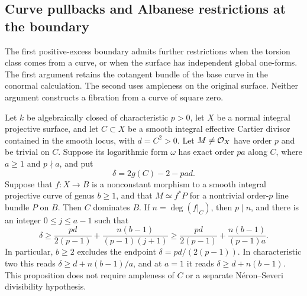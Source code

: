 \subsection{Curve pullbacks and Albanese restrictions at the boundary}
\label{subsec:boundary-albanese-restrictions}

The first positive-excess boundary admits further restrictions when the
torsion class comes from a curve, or when the surface has independent
global one-forms.  The first argument retains the cotangent bundle of
the base curve in the conormal calculation.  The second uses ampleness
on the original surface.  Neither argument constructs a fibration from
a curve of square zero.

\begin{proposition}
\label{prop:boundary-curve-pullback-excess}
Let $k$ be algebraically closed of characteristic $p>0$, let $X$ be a
normal integral projective surface, and let $C\subset X$ be a smooth
integral effective Cartier divisor contained in the smooth locus, with
$d=C^2>0$.  Let $M\ne\mathcal O_X$ have order $p$ and be trivial on $C$.
Suppose its logarithmic form $\omega$ has exact order $pa$ along $C$,
where $a\geq1$ and $p\nmid a$, and put
\[
 \delta=2g(C)-2-pad.
\]
Suppose that $f:X\to B$ is a nonconstant morphism to a smooth integral
projective curve of genus $b\geq1$, and that
$M\simeq f^*P$ for a nontrivial order-$p$ line bundle $P$ on $B$.
Then $C$ dominates $B$. If $n=\deg(f|_C)$, then $p\mid n$, and there is an integer
$0\leq j\leq a-1$ such that
\begin{equation}\label{eq:boundary-curve-pullback-bound}
 \delta\geq\frac{pd}{2(p-1)}+
       \frac{n(b-1)}{(p-1)(j+1)}
 \geq\frac{pd}{2(p-1)}+\frac{n(b-1)}{(p-1)a}.
\end{equation}
In particular, $b\geq2$ excludes the endpoint
$\delta=pd/(2(p-1))$. In characteristic two this reads
$\delta\geq d+n(b-1)/a$, and at $a=1$ it reads
$\delta\geq d+n(b-1)$.  This proposition does not require ampleness of
$C$ or a separate N\'eron--Severi divisibility hypothesis.
\end{proposition}

